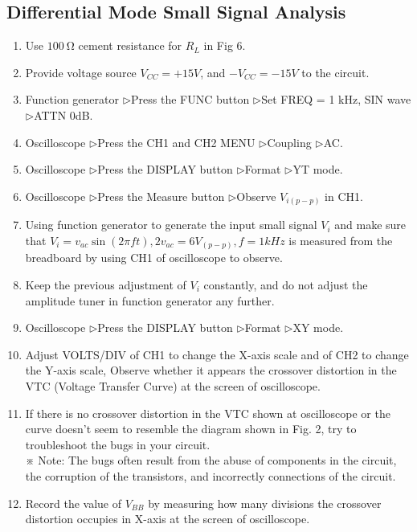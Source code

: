 \documentclass[12pt, a4paper]{article}
\newcommand{\tri}{$\rhd$}
\begin{document}
\subsection{Differential Mode Small Signal Analysis}
\begin{enumerate}[itemsep=0pt]
  \item  Use $\SI{100}\ohm$ cement resistance for $R_L$ in Fig 6.
  \item  Provide voltage source $V_{CC} = +15V$, and $-V_{CC} = −15V$ to the circuit.
  \item  Function generator  \tri  Press the FUNC button  \tri Set FREQ = 1 kHz, SIN
wave  \tri ATTN 0dB.
\item  Oscilloscope  \tri  Press the CH1 and CH2 MENU  \tri  Coupling  \tri  AC.
\item  Oscilloscope  \tri  Press the DISPLAY button  \tri  Format  \tri  YT mode.
\item  Oscilloscope  \tri  Press the Measure button  \tri  Observe $V_{i(p-p)}$ in CH1.
\item Using function generator to generate the input small signal $V_i$ and make sure
  that $V_i = v_{ac} \sin(2\pi ft), 2v_{ac} = 6V_{(p-p)} , f = 1 kHz$ is measured 
  from the breadboard by using CH1 of oscilloscope to observe.
\item  Keep the previous adjustment of $V_i$ constantly, and do not adjust the
amplitude tuner in function generator any further.
\item  Oscilloscope  \tri  Press the DISPLAY button  \tri  Format  \tri  XY mode.
\item Adjust VOLTS/DIV of CH1 to change the X-axis scale and of CH2 to
change the Y-axis scale, Observe whether it appears the crossover
distortion in the VTC (Voltage Transfer Curve) at the screen of
oscilloscope.
\item  If there is no crossover distortion in the VTC shown at oscilloscope or the
curve doesn’t seem to resemble the diagram shown in Fig. 2, try to
troubleshoot the bugs in your circuit. \\
※ Note: The bugs often result from the abuse of components in the circuit,
the corruption of the transistors, and incorrectly connections of the circuit.
\item  Record the value of $V_{BB}$ by measuring how many divisions the crossover distortion 
  occupies in X-axis at the screen of oscilloscope.
\end{enumerate}
\end{document}
